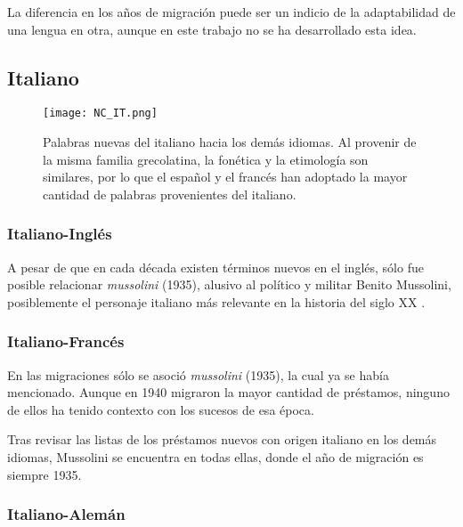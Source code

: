 La diferencia en los años de migración puede ser un indicio de la adaptabilidad de una lengua en otra, aunque en este trabajo no se ha desarrollado esta idea. 



\subsection{Italiano}%

\begin{figure}
	\centering
	\texttt{[image: NC\_IT.png]}
	\caption{Palabras nuevas del italiano hacia los demás idiomas. Al provenir de la misma familia grecolatina, la fonética y la etimología son similares, por lo que  el español y el francés han adoptado la mayor cantidad de palabras provenientes del italiano.} 
	\label{fig.NC_IT}
\end{figure}




\subsubsection*{Italiano-Inglés}%

A pesar de que en cada década existen términos nuevos en el inglés, sólo fue posible relacionar \textit{mussolini} (1935),  alusivo al político y militar Benito Mussolini, posiblemente el personaje italiano más relevante en la historia del siglo XX .

\subsubsection*{Italiano-Francés}%



En las migraciones sólo se asoció \textit{mussolini} (1935), la cual ya se había mencionado. Aunque en 1940 migraron la mayor cantidad de préstamos, ninguno de ellos ha tenido contexto con los sucesos de esa época. 

Tras revisar las listas de los préstamos nuevos con origen italiano  en los demás idiomas, Mussolini se encuentra en todas ellas, donde  el año de migración es siempre 1935.





\subsubsection*{Italiano-Alemán}%

